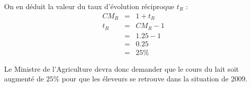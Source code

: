 \begin{ex}{}{}
On en déduit la valeur du taux d'évolution réciproque $t_{R}$ :
\begin{eqnarray*}
CM_{R} &=& 1 + t_{R}\\
t_{R} &=& CM_{R} - 1\\
&=& 1.25 - 1\\
&=& 0.25\\
&=& 25\%\
\end{eqnarray*}

Le Ministre de l'Agriculture devra donc demander que le cours du lait soit augmenté de $25\%$ pour que les éleveurs se retrouve dans la situation de 2009.
\end{ex}